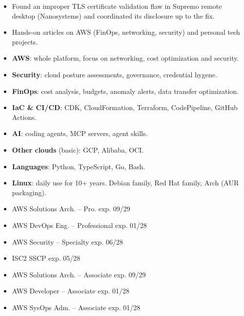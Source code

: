 
\begin{itemize}
\item Found an improper TLS certificate validation flaw in Supremo remote desktop (Nanosystems) and coordinated its disclosure up to the fix.
\end{itemize}
\begin{itemize}
\item Hands-on articles on AWS (FinOps, networking, security) and personal tech projects.
\end{itemize}
\smallskip

\begin{itemize}[leftmargin=0pt,label={},itemsep=3pt]
\item \textbf{AWS}: whole platform, focus on networking, cost optimization and security.
\item \textbf{Security}: cloud posture assessments, governance, credential hygene.
\item \textbf{FinOps}: cost analysis, budgets, anomaly alerts, data transfer optimization.
\item \textbf{IaC \& CI/CD}: CDK, CloudFormation, Terraform, CodePipeline, GitHub Actions.
\item \textbf{AI}: coding agents, MCP servers, agent skills.
\item \textbf{Other clouds} (basic): GCP, Alibaba, OCI.
\item \textbf{Languages}: Python, TypeScript, Go, Bash.
\item \textbf{Linux}: daily use for 10+ years. Debian family, Red Hat family, Arch (AUR packaging).
\end{itemize}

\begin{itemize}[leftmargin=0pt,label={},itemsep=2pt]
\item AWS Solutions Arch. -- Pro. \hfill {\small exp. 09/29}
\item AWS DevOps Eng. -- Professional \hfill {\small exp. 01/28}
\item AWS Security -- Specialty \hfill {\small exp. 06/28}
\item ISC2 SSCP \hfill {\small exp. 05/28}
\item AWS Solutions Arch. -- Associate \hfill {\small exp. 09/29}
\item AWS Developer -- Associate \hfill {\small exp. 01/28}
\item AWS SysOps Adm. -- Associate \hfill {\small exp. 01/28}
\end{itemize}
